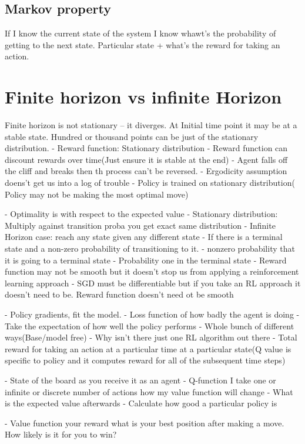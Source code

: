 \documentclass{article}
\begin{document}
\subsection{Markov property}
If I know the current state of the system I know whawt's the
probability of getting to the next state. Particular state + what's
the reward for taking an action.

\section{Finite horizon vs infinite Horizon}
Finite horizon is not stationary -- it diverges.
At Initial time point it may be at a stable state. Hundred or thousand points can be just of the stationary distribution.
- Reward function: Stationary distribution
- Reward function can discount rewards over time(Just ensure it is stable at the end)
- Agent falls off the cliff and breaks then th process can't be reversed.
- Ergodicity assumption doens't get us into a log of trouble
- Policy is trained on stationary distribution( Policy may not be making the most optimal move)

- Optimality is with respect to the expected value
- Stationary distribution: Multiply against transition proba you get exact same distribution
- Infinite Horizon case: reach any state given any different state
- If there is a terminal state and a non-zero probability of transitioning to it.
- nonzero probability that it is going to a terminal state
- Probability one in the terminal state
- Reward function may not be smooth but it doesn't stop us from applying a reinforcement learning approach
- SGD must be differentiable but if you take an RL approach it doesn't need to be. Reward function doesn't need ot be smooth

- Policy gradients, fit the model.
- Loss function of how badly the agent is doing
- Take the expectation of how well the policy performs
- Whole bunch of different ways(Base/model free)
- Why isn't there just one RL algorithm out there
- Total reward for taking an action at a particular time at a particular state(Q value is specific to policy and it computes reward for all of the subsequent time steps)


- State of the board as you receive it as an agent
- Q-function I take one or infinite or discrete number of actions how my value function will change
- What is the expected value afterwards
- Calculate how good a particular policy is


- Value function your reward what is your best position after making a move. How likely is it for you to win? 
\end{document}

